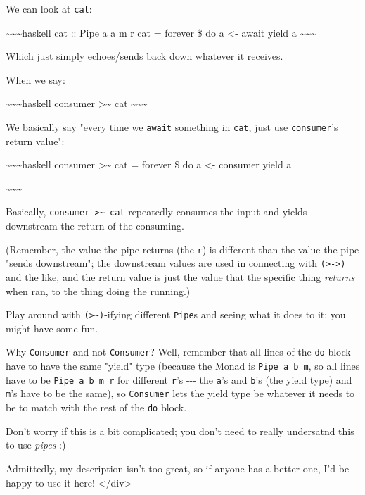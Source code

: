 \documentclass[]{article}
\begin{document}
We can look at \texttt{cat}:

\textasciitilde{}\textasciitilde{}\textasciitilde{}haskell cat :: Pipe a a m r
cat = forever \$ do a \textless{}- await yield a
\textasciitilde{}\textasciitilde{}\textasciitilde{}

Which just simply echoes/sends back down whatever it receives.

When we say:

\textasciitilde{}\textasciitilde{}\textasciitilde{}haskell consumer
\textgreater{}\textasciitilde{} cat
\textasciitilde{}\textasciitilde{}\textasciitilde{}

We basically say "every time we \texttt{await} something in \texttt{cat}, just
use \texttt{consumer}'s return value":

\textasciitilde{}\textasciitilde{}\textasciitilde{}haskell consumer
\textgreater{}\textasciitilde{} cat = forever \$ do a \textless{}- consumer
yield a

\textasciitilde{}\textasciitilde{}\textasciitilde{}

Basically, \texttt{consumer\ \textgreater{}\textasciitilde{}\ cat} repeatedly
consumes the input and yields downstream the return of the consuming.

(Remember, the value the pipe returns (the \texttt{r}) is different than the
value the pipe "sends downstream"; the downstream values are used in connecting
with \texttt{(\textgreater{}-\textgreater{})} and the like, and the return value
is just the value that the specific thing \emph{returns} when ran, to the thing
doing the running.)

Play around with \texttt{(\textgreater{}\textasciitilde{})}-ifying different
\texttt{Pipe}s and seeing what it does to it; you might have some fun.

Why \texttt{Consumer\textquotesingle{}} and not \texttt{Consumer}? Well,
remember that all lines of the \texttt{do} block have to have the same "yield"
type (because the Monad is \texttt{Pipe\ a\ b\ m}, so all lines have to be
\texttt{Pipe\ a\ b\ m\ r} for different \texttt{r}'s -\/-\/- the \texttt{a}'s
and \texttt{b}'s (the yield type) and \texttt{m}'s have to be the same), so
\texttt{Consumer\textquotesingle{}} lets the yield type be whatever it needs to
be to match with the rest of the \texttt{do} block.

Don't worry if this is a bit complicated; you don't need to really undersatnd
this to use \emph{pipes} :)

Admittedly, my description isn't too great, so if anyone has a better one, I'd
be happy to use it here! \textless{}/div\textgreater{}
\end{document}
